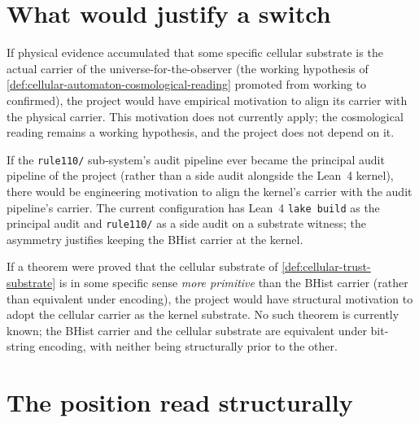 \section{What would justify a switch}
\label{sec:cellular-carrier-switch-conditions}

\begin{remark}
\label{rem:cellular-carrier-physical-realisation-evidence}
If physical evidence accumulated that some specific cellular substrate is the actual carrier of the universe-for-the-observer (the working hypothesis of \autoref{def:cellular-automaton-cosmological-reading} promoted from working to confirmed), the project would have empirical motivation to align its carrier with the physical carrier. This motivation does not currently apply; the cosmological reading remains a working hypothesis, and the project does not depend on it.
\end{remark}

\begin{remark}
\label{rem:cellular-carrier-engineering-convergence}
If the \texttt{rule110/} sub-system's audit pipeline ever became the principal audit pipeline of the project (rather than a side audit alongside the Lean~4 kernel), there would be engineering motivation to align the kernel's carrier with the audit pipeline's carrier. The current configuration has Lean~4 \texttt{lake build} as the principal audit and \texttt{rule110/} as a side audit on a substrate witness; the asymmetry justifies keeping the BHist carrier at the kernel.
\end{remark}

\begin{remark}
\label{rem:cellular-carrier-theoretical-reduction}
If a theorem were proved that the cellular substrate of \autoref{def:cellular-trust-substrate} is in some specific sense \emph{more primitive} than the BHist carrier (rather than equivalent under encoding), the project would have structural motivation to adopt the cellular carrier as the kernel substrate. No such theorem is currently known; the BHist carrier and the cellular substrate are equivalent under bit-string encoding, with neither being structurally prior to the other.
\end{remark}

\section{The position read structurally}
\label{sec:cellular-carrier-position-read-structurally}

